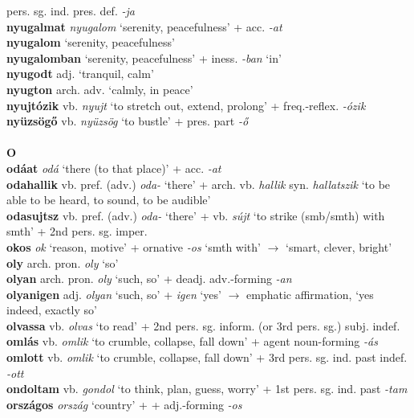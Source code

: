 \documentclass[11pt]{article}
\begin{document}
pers. sg. ind. pres. def. \emph{-ja} \\
\textbf{nyugalmat} \emph{nyugalom} `serenity, peacefulness' +
acc. \emph{-at} \\
\textbf{nyugalom} `serenity, peacefulness' \\
\textbf{nyugalomban} `serenity, peacefulness' + iness. \emph{-ban}
`in' \\
\textbf{nyugodt} adj. `tranquil, calm'\\
\textbf{nyugton} arch. adv. `calmly, in peace' \\
\textbf{nyujtózik} vb. \emph{nyujt} `to stretch out, extend, prolong' + freq.\hyp{}reflex. \emph{-ózik} \\
\textbf{nyüzsögő} vb. \emph{nyüzsög} `to bustle' +
pres. part \emph{-ő} \\
\ \\
\noindent \textbf{\large O} \\
\textbf{odáat} \emph{odá} `there (to that place)' + acc. \emph{-at} \\
\textbf{odahallik} vb. pref. (adv.) \emph{oda-} `there' +
arch. vb. \emph{hallik} syn. \emph{hallatszik} `to be able to be
heard, to sound, to be audible' \\
\textbf{odasujtsz} vb. pref. (adv.) \emph{oda-} `there' +
vb. \emph{sújt} `to strike (smb/smth) with smth' + 2nd
pers. sg. imper. \\
\textbf{okos} \emph{ok} `reason, motive' + ornative \emph{-os} `smth
with' $\rightarrow$ `smart, clever, bright' \\
\textbf{oly} arch. pron. \emph{oly} `so' \\
\textbf{olyan} arch. pron. \emph{oly} `such, so' + deadj. adv.\hyp{}forming
\emph{-an} \\
\textbf{olyanigen} adj. \emph{olyan} `such, so' + \emph{igen} `yes'
$\rightarrow$ emphatic affirmation, `yes indeed, exactly so' \\
\textbf{olvassa} vb. \emph{olvas} `to read' + 2nd
pers. sg. inform. (or 3rd pers. sg.) subj. indef. \\
\textbf{omlás} vb. \emph{omlik} `to crumble, collapse, fall down' +
agent noun\hyp{}forming \emph{-ás} \\
\textbf{omlott} vb. \emph{omlik} `to crumble, collapse, fall down' +
3rd pers. sg. ind. past indef. \emph{-ott} \\
\textbf{ondoltam} vb. \emph{gondol} `to think, plan, guess, worry' +
1st pers. sg. ind. past \emph{-tam} \\
\textbf{országos} \emph{ország} `country' + + adj.\hyp{}forming \emph{-os}
\end{document}
